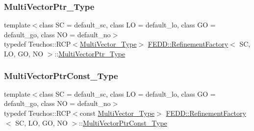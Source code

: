 \mbox{\label{classFEDD_1_1RefinementFactory_a0592bb145b1f5b1daac2e69a96c23cb5}} 
\subsubsection{\texorpdfstring{Multi\+Vector\+Ptr\+\_\+\+Type}{MultiVectorPtr\_Type}}
{\footnotesize\ttfamily template$<$class SC  = default\+\_\+sc, class LO  = default\+\_\+lo, class GO  = default\+\_\+go, class NO  = default\+\_\+no$>$ \\
typedef Teuchos\+::\+R\+CP$<$\hyperlink{classFEDD_1_1RefinementFactory_af7c4cb285d95e61820d63b9344a90976}{Multi\+Vector\+\_\+\+Type}$>$ \hyperlink{classFEDD_1_1RefinementFactory}{F\+E\+D\+D\+::\+Refinement\+Factory}$<$ SC, LO, GO, NO $>$\+::\hyperlink{classFEDD_1_1RefinementFactory_a0592bb145b1f5b1daac2e69a96c23cb5}{Multi\+Vector\+Ptr\+\_\+\+Type}}

\mbox{\label{classFEDD_1_1RefinementFactory_af904cdbfa726de22dcea9dfcc891114b}} 
\subsubsection{\texorpdfstring{Multi\+Vector\+Ptr\+Const\+\_\+\+Type}{MultiVectorPtrConst\_Type}}
{\footnotesize\ttfamily template$<$class SC  = default\+\_\+sc, class LO  = default\+\_\+lo, class GO  = default\+\_\+go, class NO  = default\+\_\+no$>$ \\
typedef Teuchos\+::\+R\+CP$<$const \hyperlink{classFEDD_1_1RefinementFactory_af7c4cb285d95e61820d63b9344a90976}{Multi\+Vector\+\_\+\+Type}$>$ \hyperlink{classFEDD_1_1RefinementFactory}{F\+E\+D\+D\+::\+Refinement\+Factory}$<$ SC, LO, GO, NO $>$\+::\hyperlink{classFEDD_1_1RefinementFactory_af904cdbfa726de22dcea9dfcc891114b}{Multi\+Vector\+Ptr\+Const\+\_\+\+Type}}

